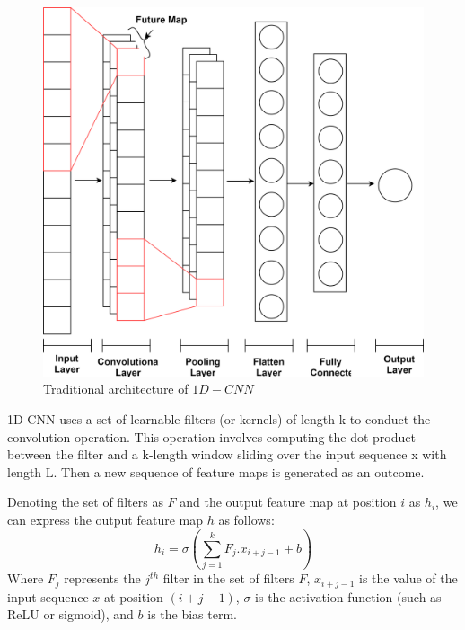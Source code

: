 \documentclass[a4paper, fleqn]{cas-sc}
\theoremstyle{definition}
\theoremstyle{remark}
\begin{document}
\begin{figure}[h!]
  \centering
    \includegraphics[scale=.5]{cnn}
    \caption{Traditional architecture of $1D-CNN$}\label{CNN}
\end{figure}

1D CNN uses a set of learnable filters (or kernels) of length k to conduct the convolution operation. This operation involves computing the dot product between the filter and a k-length window sliding over the input sequence x with length L. Then a new sequence of feature maps is generated as an outcome.

\par Denoting the set of filters as $F$ and the output feature map at position $i$ as $h_i$,  we can express the output feature map $h$ as follows: 
\begin{equation}\label{equ: cnn}
        h_i = \sigma \left(\sum_{j=1}^{k}F_{j}.x_{i+j-1}+b \right)
\end{equation}
Where $F_j$ represents the $j^{th}$ filter in the set of filters $F$,  $x_{i+j-1}$ is the value of the input sequence $x$ at position $(i+j-1)$,  $\sigma$ is the activation function (such as ReLU or sigmoid),  and $b$ is the bias term.
\end{document}
